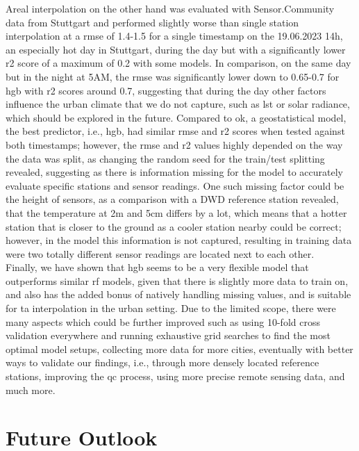 Areal interpolation on the other hand was evaluated with Sensor.Community data from Stuttgart and performed slightly worse than single station interpolation at a \gls{rmse} of 1.4-1.5 for a single timestamp on the 19.06.2023 14h, an especially hot day in Stuttgart, during the day but with a significantly lower \gls{r2} score of a maximum of 0.2 with some models. In comparison, on the same day but in the night at 5AM, the \gls{rmse} was significantly lower down to 0.65-0.7 for \gls{hgb} with \gls{r2} scores around 0.7, suggesting that during the day other factors influence the urban climate that we do not capture, such as \gls{lst} or solar radiance, which should be explored in the future. Compared to \gls{ok}, a geostatistical model, the best predictor, i.e., \gls{hgb}, had similar \gls{rmse} and \gls{r2} scores when tested against both timestamps; however, the \gls{rmse} and \gls{r2} values highly depended on the way the data was split, as changing the random seed for the train/test splitting revealed, suggesting as there is information missing for the model to accurately evaluate specific stations and sensor readings. One such missing factor could be the height of sensors, as a comparison with a DWD reference station revealed, that the temperature at 2m and 5cm differs by a lot, which means that a hotter station that is closer to the ground as a cooler station nearby could be correct; however, in the model this information is not captured, resulting in training data were two totally different sensor readings are located next to each other.\\
Finally, we have shown that \gls{hgb} seems to be a very flexible model that outperforms similar \gls{rf} models, given that there is slightly more data to train on, and also has the added bonus of natively handling missing values, and is suitable for \gls{ta} interpolation in the urban setting. Due to the limited scope, there were many aspects which could be further improved such as using 10-fold cross validation everywhere and running exhaustive grid searches to find the most optimal model setups, collecting more data for more cities, eventually with better ways to validate our findings, i.e., through more densely located reference stations, improving the \gls{qc} process, using more precise remote sensing data, and much more.

\section{Future Outlook}

